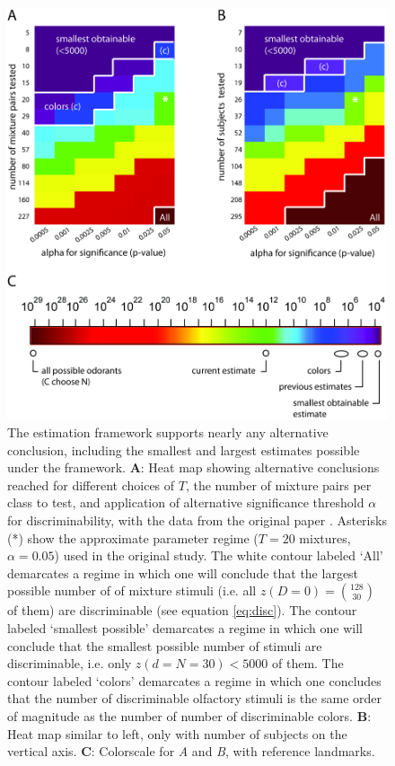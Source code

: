 \documentclass[letterpaper,twocolumn,10pt]{article}
\begin{document}
\begin{figure}
    \centering
    \includegraphics[width=1.0\textwidth]{figures/Fig3_Colormaps}
    \caption{
The estimation framework supports nearly any alternative conclusion, including the smallest and largest estimates possible under the framework. 
\textbf{A}: Heat map showing alternative conclusions reached for different choices of $T$, the number of mixture pairs per class to test, 
and application of alternative significance threshold $\alpha$ for discriminability, with the data from the original paper \cite{bushdid_humans_2014}. 
Asterisks (*) show the approximate parameter regime ($T=20$ mixtures, $\alpha=0.05$) used in the original study. 
The white contour labeled `All' demarcates a regime in which one will conclude that the largest possible number of of mixture stimuli (i.e. all $z(D=0)={128 \choose 30}$ of them) are discriminable (see equation \ref{eq:disc}). 
The contour labeled `smallest possible' demarcates a regime in which one will conclude that 
the smallest possible number of stimuli are discriminable, i.e. only $z(d=N=30)<5000$ of them.
The contour labeled `colors' demarcates a regime in which 
one concludes that the number of discriminable olfactory stimuli is the same order of magnitude as the number of number of discriminable colors. 
\textbf{B}: Heat map similar to left, only with number of subjects on the vertical axis.
\textbf{C}: Colorscale for \textit{A} and \textit{B}, with reference landmarks.}
    \label{fig:colormaps}
\end{figure}
\end{document}
